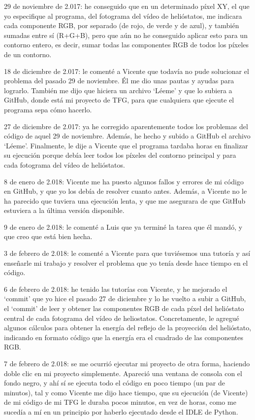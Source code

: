 29 de noviembre de 2.017: he conseguido que en un determinado píxel XY, el que yo especifique al programa, del fotograma del vídeo de helióstatos, me indicara cada componente RGB, por separado (de rojo, de verde y de azul), y también sumadas entre sí (R+G+B), pero que aún no he conseguido aplicar esto para un contorno entero, es decir, sumar todas las componentes RGB de todos los píxeles de un contorno.

18 de diciembre de 2.017: le comenté a Vicente que todavía no pude solucionar el problema del pasado 29 de noviembre. Él me dio unas pautas y ayudas para lograrlo. También me dijo que hiciera un archivo ‘Léeme’ y que lo subiera a GitHub, donde está mi proyecto de TFG, para que cualquiera que ejecute el programa sepa cómo hacerlo.

27 de diciembre de 2.017: ya he corregido aparentemente todos los problemas del código de aquel 29 de noviembre. Además, he hecho y subido a GitHub el archivo ‘Léeme’. Finalmente, le dije a Vicente que el programa tardaba horas en finalizar su ejecución porque debía leer todos los píxeles del contorno principal y para cada fotograma del vídeo de helióstatos.

8 de enero de 2.018: Vicente me ha puesto algunos fallos y errores de mi código en GitHub, y que yo los debía de resolver cuanto antes. Además, a Vicente no le ha parecido que tuviera una ejecución lenta, y que me asegurara de que GitHub estuviera a la última versión disponible.

9 de enero de 2.018: le comenté a Luis que ya terminé la tarea que él mandó, y que creo que está bien hecha.

3 de febrero de 2.018: le comenté a Vicente para que tuviésemos una tutoría y así enseñarle mi trabajo y resolver el problema que yo tenía desde hace tiempo en el código.

6 de febrero de 2.018: he tenido las tutorías con Vicente, y he mejorado el ‘commit’ que yo hice el pasado 27 de diciembre y lo he vuelto a subir a GitHub, el ‘commit’ de leer y obtener las componentes RGB de cada píxel del helióstato central de cada fotograma del vídeo de heliostatos. Concretamente, le agregué algunos cálculos para obtener la energía del reflejo de la proyección del helióstato, indicando en formato código que la energía era el cuadrado de las componentes RGB.

7 de febrero de 2.018: se me ocurrió ejecutar mi proyecto de otra forma, haciendo doble clic en mi proyecto simplemente. Apareció una ventana de consola con el fondo negro, y ahí sí se ejecuta todo el código en poco tiempo (un par de minutos), tal y como Vicente me dijo hace tiempo, que su ejecución (de Vicente) de mi código de mi TFG le duraba pocos minutos, en vez de horas, como me sucedía a mí en un principio por haberlo ejecutado desde el IDLE de Python.

